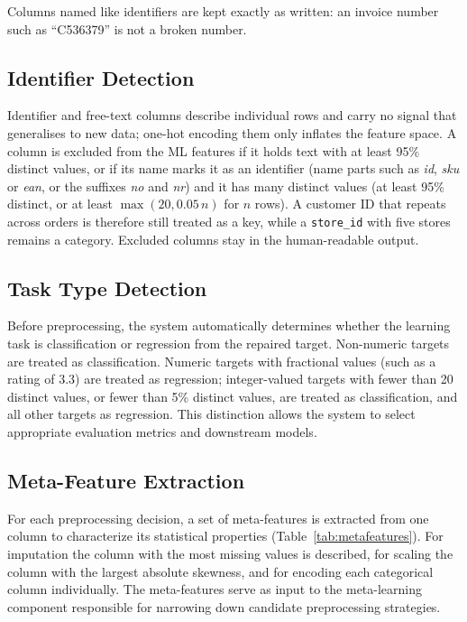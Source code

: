 \documentclass[11pt,a4paper]{article}
\begin{document}
Columns named like identifiers are kept exactly as written: an invoice number such as ``C536379'' is not a broken number.

\subsection{Identifier Detection}

Identifier and free-text columns describe individual rows and carry no signal that generalises to new data; one-hot encoding them only inflates the feature space. A column is excluded from the ML features if it holds text with at least 95\% distinct values, or if its name marks it as an identifier (name parts such as \emph{id}, \emph{sku} or \emph{ean}, or the suffixes \emph{no} and \emph{nr}) and it has many distinct values (at least 95\% distinct, or at least $\max(20, 0.05\,n)$ for $n$ rows). A customer ID that repeats across orders is therefore still treated as a key, while a \texttt{store\_id} with five stores remains a category. Excluded columns stay in the human-readable output.

\subsection{Task Type Detection}

Before preprocessing, the system automatically determines whether the learning task is classification or regression from the repaired target. Non-numeric targets are treated as classification. Numeric targets with fractional values (such as a rating of 3.3) are treated as regression; integer-valued targets with fewer than 20 distinct values, or fewer than 5\% distinct values, are treated as classification, and all other targets as regression. This distinction allows the system to select appropriate evaluation metrics and downstream models.

\subsection{Meta-Feature Extraction}

For each preprocessing decision, a set of meta-features is extracted from one column to characterize its statistical properties (Table~\ref{tab:metafeatures}). For imputation the column with the most missing values is described, for scaling the column with the largest absolute skewness, and for encoding each categorical column individually. The meta-features serve as input to the meta-learning component responsible for narrowing down candidate preprocessing strategies.
\end{document}
